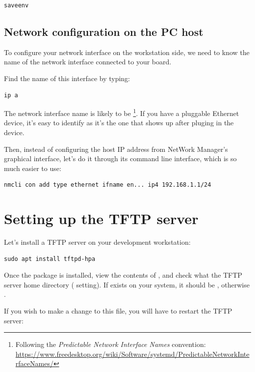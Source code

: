 \begin{verbatim}
saveenv
\end{verbatim}

\subsection{Network configuration on the PC host}

To configure your network interface on the workstation side, we need
to know the name of the network interface connected to your board.

Find the name of this interface by typing:

\begin{verbatim}
ip a
\end{verbatim}

The network interface name is likely to be
\footnote{Following the {\em Predictable Network Interface
Names} convention:
\url{https://www.freedesktop.org/wiki/Software/systemd/PredictableNetworkInterfaceNames/}}.
If you have a pluggable Ethernet device, it's easy to identify as it's
the one that shows up after pluging in the device.

Then, instead of configuring the host IP address from NetWork Manager's
graphical interface, let's do it through its command line interface,
which is so much easier to use:

\begin{verbatim}
nmcli con add type ethernet ifname en... ip4 192.168.1.1/24
\end{verbatim}

\section{Setting up the TFTP server}

Let's install a TFTP server on your development workstation:

\begin{verbatim}
sudo apt install tftpd-hpa
\end{verbatim}

Once the package is installed, view the contents of
, and check what the TFTP server home directory
( setting). If  exists on your system,
it should be , otherwise .

If you wish to make a change to this file, you will have to restart the TFTP server:

